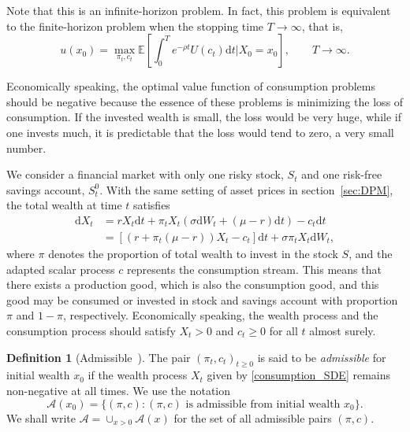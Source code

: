 \documentclass[a4paper]{article}
\theoremstyle{definition}
\newtheorem{definition}[theorem]{Definition}
\numberwithin{equation}{section}
\begin{document}
Note that this is an infinite-horizon problem. In fact, this problem is equivalent to the finite-horizon problem when the stopping time $T\rightarrow\infty$, that is,
\begin{equation}\label{finite-problem}
u(x_0)=\max_{\pi_t,c_t}\mathbb E[\int^T_0e^{-\rho t}U(c_t)\mathrm dt\lvert X_0=x_0],\qquad T\rightarrow\infty.
\end{equation}

Economically speaking, the optimal value function of consumption problems should be negative because the essence of these problems is minimizing the loss of consumption. If the invested wealth is small, the loss would be very huge, while if one invests much, it is predictable that the loss would tend to zero, a very small number.

We consider a financial market with only one risky stock, $S_t$ and one risk-free savings account, $S^0_t$. With the same setting of asset prices in section~\ref{sec:DPM}, the total wealth at time $t$ satisfies
\begin{equation}\label{consumption_SDE}
\begin{aligned}
\mathrm dX_t&=rX_t\mathrm dt+\pi_tX_t(\sigma\mathrm dW_t+(\mu-r)\mathrm dt)-c_t\mathrm dt\\
&=[(r+\pi_t(\mu-r))X_t-c_t]\mathrm dt+\sigma\pi_tX_t\mathrm dW_t,
\end{aligned}
\end{equation}
where $\pi$ denotes the proportion of total wealth to invest in the stock $S$, and the adapted scalar process $c$ represents the consumption stream. This means that there exists a production good, which is also the consumption good, and this good may be consumed or invested in stock and savings account with proportion $\pi$ and $1-\pi$, respectively. Economically speaking, the wealth process and the consumption process should satisfy $X_t>0$ and $c_t\geq0$ for all $t$ almost surely.

\begin{definition}[Admissible~\cite{book3}]
The pair $(\pi_t,c_t)_{t\geq0}$ is said to be \emph{admissible} for initial wealth $x_0$ if the wealth process $X_t$ given by \eqref{consumption_SDE} remains non-negative at all times. We use the notation
$$\mathcal A(x_0)=\{(\pi,c):(\pi,c)\text{ is admissible from initial wealth }x_0\}.$$
We shall write $\mathcal A=\cup_{x>0}\mathcal A(x)$ for the set of all admissible pairs $(\pi,c)$.
\end{definition}
\end{document}
